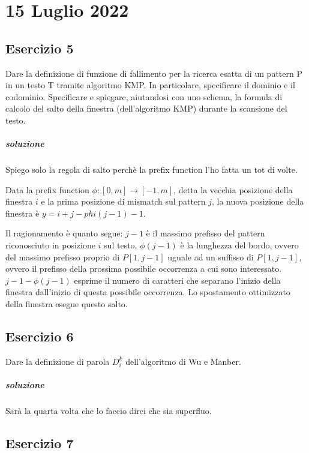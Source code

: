 \chapter{15 Luglio 2022}

\section{Esercizio 5}

Dare la definizione di funzione di fallimento per la ricerca esatta di un pattern P in un testo T tramite algoritmo KMP. In particolare, specificare il dominio e il codominio.
Specificare e spiegare, aiutandosi con uno schema, la formula di calcolo del salto della finestra (dell'algoritmo KMP) durante la scansione del testo.

\paragraph{soluzione} Spiego solo la regola di salto perch\`e la prefix function l'ho fatta un tot di volte.

Data la prefix function $\phi : [0,m] \rightarrow [-1,m]$, detta la vecchia posizione della finestra $i$ e la prima posizione di mismatch sul pattern $j$, la nuova posizione della finestra \`e $y = i + j - phi(j-1) - 1$.

Il ragionamento \`e quanto segue: $j-1$ \`e il massimo prefisso del pattern riconosciuto in posizione $i$ sul testo, $\phi(j-1)$ \`e la lunghezza del bordo, ovvero del massimo prefisso proprio di $P[1,j-1]$ uguale ad un suffisso di $P[1,j-1]$, ovvero il prefisso della prossima possibile occorrenza a cui sono interessato. $j - 1 - \phi(j - 1)$ esprime il numero di caratteri che separano l'inizio della finestra dall'inizio di questa possibile occorrenza. Lo spostamento ottimizzato della finestra esegue questo salto.

\section{Esercizio 6}

Dare la definizione di parola $D^k_i$ dell'algoritmo di Wu e Manber.

\paragraph{soluzione} Sar\`a la quarta volta che lo faccio direi che sia superfluo.

\section{Esercizio 7}

